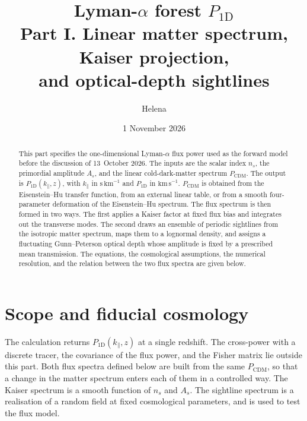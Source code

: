 \documentclass[11pt]{article}
\title{Lyman-$\alpha$ forest $P_{1\mathrm{D}}$\\[0.35em]
\large Part I. Linear matter spectrum, Kaiser projection,\\
and optical-depth sightlines}
\author{Helena}
\date{1 November 2026}
\begin{document}
\maketitle

\begin{abstract}
This part specifies the one-dimensional Lyman-$\alpha$ flux power used as the forward model before the discussion of 13~October 2026.
The inputs are the scalar index $n_s$, the primordial amplitude $A_s$, and the linear cold-dark-matter spectrum $P_\mathrm{CDM}$.
The output is $P_{1\mathrm{D}}(k_\parallel,z)$, with $k_\parallel$ in $\mathrm{s\,km}^{-1}$ and $P_{1\mathrm{D}}$ in $\mathrm{km\,s}^{-1}$.
$P_\mathrm{CDM}$ is obtained from the Eisenstein--Hu transfer function, from an external linear table, or from a smooth four-parameter deformation of the Eisenstein--Hu spectrum.
The flux spectrum is then formed in two ways.
The first applies a Kaiser factor at fixed flux bias and integrates out the transverse modes.
The second draws an ensemble of periodic sightlines from the isotropic matter spectrum, maps them to a lognormal density, and assigns a fluctuating Gunn--Peterson optical depth whose amplitude is fixed by a prescribed mean transmission.
The equations, the cosmological assumptions, the numerical resolution, and the relation between the two flux spectra are given below.
\end{abstract}

\section{Scope and fiducial cosmology}
\label{sec:scope}

The calculation returns $P_{1\mathrm{D}}(k_\parallel,z)$ at a single redshift.
The cross-power with a discrete tracer, the covariance of the flux power, and the Fisher matrix lie outside this part.
Both flux spectra defined below are built from the same $P_\mathrm{CDM}$, so that a change in the matter spectrum enters each of them in a controlled way.
The Kaiser spectrum is a smooth function of $n_s$ and $A_s$.
The sightline spectrum is a realisation of a random field at fixed cosmological parameters, and is used to test the flux model.
\end{document}
